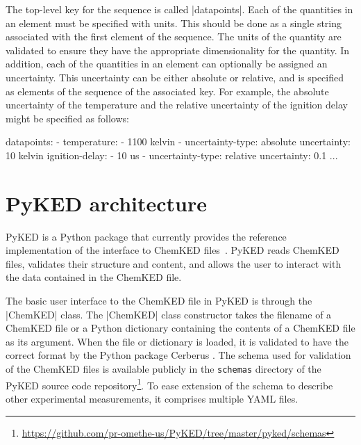\documentclass[12pt]{ijck}
\newcommand\ck{ChemKED}
\newcommand\pk{PyKED}
\begin{document}
The top-level key for the sequence is called \yabox|datapoints|. Each of the
quantities in an element must be specified with units. This should be done as a
single string associated with the first element of the sequence. The units of
the quantity are validated to ensure they have the appropriate dimensionality
for the quantity. In addition, each of the quantities in an element can
optionally be assigned an uncertainty. This uncertainty can be either absolute
or relative, and is specified as elements of the sequence of the associated key.
For example, the absolute uncertainty of the temperature and the relative
uncertainty of the ignition delay might be specified as follows:

\begin{yamlbox}
datapoints:
  - temperature:
      - 1100 kelvin
      - uncertainty-type: absolute
        uncertainty: 10 kelvin
    ignition-delay:
      - 10 us
      - uncertainty-type: relative
        uncertainty: 0.1
    ...
\end{yamlbox}

\section{PyKED architecture}\label{sec:pyked-architecture}
%
\pk{} is a Python package that currently provides the reference implementation
of the interface to \ck{} files~\autocite{PyKED}. \pk{} reads \ck{} files, validates
their structure and content, and allows the user to interact with the data contained
in the \ck{} file.

The basic user interface to the \ck{} file in \pk{} is through the
\pybox|ChemKED| class. The \pybox|ChemKED| class constructor takes the filename
of a \ck{} file or a Python dictionary containing the contents of a \ck{} file
as its argument. When the file or dictionary is loaded, it is validated to have
the correct format by the Python package Cerberus \autocite{cerberus}. The
schema used for validation of the \ck{} files is available publicly in the
\texttt{schemas} directory of the PyKED source code
repository\footnote{\url{https://github.com/pr-omethe-us/PyKED/tree/master/pyked/schemas}}.
To ease extension of the schema to describe other experimental measurements, it
comprises multiple YAML files.
\end{document}

